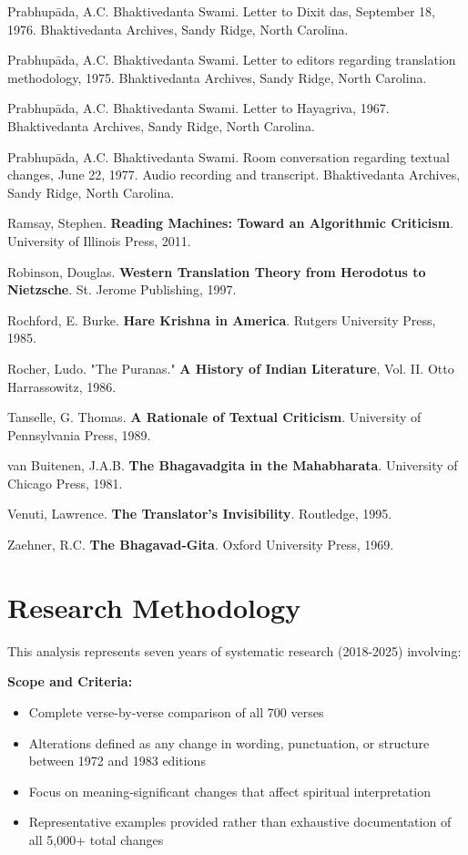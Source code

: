 \documentclass[11pt,twoside]{book}
\begin{document}
Prabhupāda, A.C. Bhaktivedanta Swami. Letter to Dixit das, September 18, 1976. Bhaktivedanta Archives, Sandy Ridge, North Carolina.

Prabhupāda, A.C. Bhaktivedanta Swami. Letter to editors regarding translation methodology, 1975. Bhaktivedanta Archives, Sandy Ridge, North Carolina.

Prabhupāda, A.C. Bhaktivedanta Swami. Letter to Hayagriva, 1967. Bhaktivedanta Archives, Sandy Ridge, North Carolina.

Prabhupāda, A.C. Bhaktivedanta Swami. Room conversation regarding textual changes, June 22, 1977. Audio recording and transcript. Bhaktivedanta Archives, Sandy Ridge, North Carolina.

Ramsay, Stephen. \textbf{Reading Machines: Toward an Algorithmic Criticism}. University of Illinois Press, 2011.

Robinson, Douglas. \textbf{Western Translation Theory from Herodotus to Nietzsche}. St. Jerome Publishing, 1997.

Rochford, E. Burke. \textbf{Hare Krishna in America}. Rutgers University Press, 1985.

Rocher, Ludo. "The Puranas." \textbf{A History of Indian Literature}, Vol. II. Otto Harrassowitz, 1986.

Tanselle, G. Thomas. \textbf{A Rationale of Textual Criticism}. University of Pennsylvania Press, 1989.

van Buitenen, J.A.B. \textbf{The Bhagavadgita in the Mahabharata}. University of Chicago Press, 1981.

Venuti, Lawrence. \textbf{The Translator's Invisibility}. Routledge, 1995.

Zaehner, R.C. \textbf{The Bhagavad-Gita}. Oxford University Press, 1969.
\section*{Research Methodology}
\label{sec:org59b0d5f}

This analysis represents seven years of systematic research (2018-2025) involving:

\textbf{\textbf{Scope and Criteria:}}
\begin{itemize}
\item Complete verse-by-verse comparison of all 700 verses
\item Alterations defined as any change in wording, punctuation, or structure between 1972 and 1983 editions
\item Focus on meaning-significant changes that affect spiritual interpretation
\item Representative examples provided rather than exhaustive documentation of all 5,000+ total changes
\end{itemize}
\end{document}
